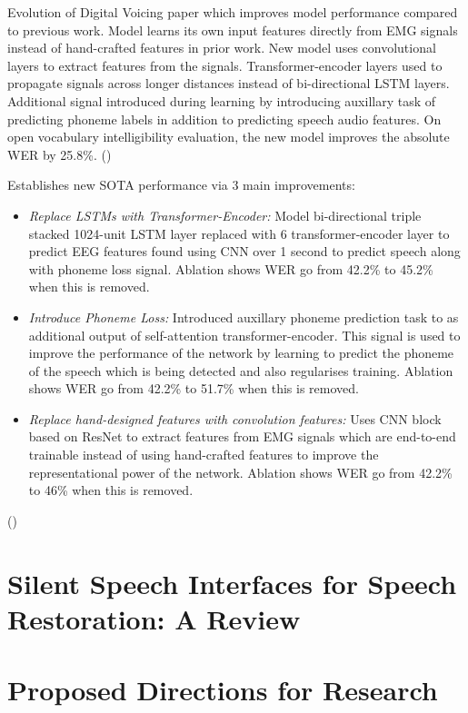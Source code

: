 Evolution of Digital Voicing paper which improves model performance compared to previous work.
Model learns its own input features directly from EMG signals instead of hand-crafted features in prior work.
New model uses convolutional layers to extract features from the signals.
Transformer-encoder layers used to propagate signals across longer distances instead of bi-directional LSTM layers.
Additional signal introduced during learning by introducing auxillary task of predicting phoneme labels in addition to predicting speech audio features.
On open vocabulary intelligibility evaluation, the new model improves the absolute WER by 25.8\%.
(\cite{gaddy2021improved})

Establishes new SOTA performance via 3 main improvements:

\begin{itemize}
  \item \emph{Replace LSTMs with Transformer-Encoder:}
  Model bi-directional triple stacked 1024-unit LSTM layer replaced with 6 transformer-encoder
  layer to predict EEG features found using CNN over 1 second to predict speech along with
  phoneme loss signal.
  Ablation shows WER go from 42.2\% to 45.2\% when this is removed.
  \item \emph{Introduce Phoneme Loss:}
  Introduced auxillary phoneme prediction task to as additional 
  output of self-attention transformer-encoder. This signal is used to improve the performance
  of the network by learning to predict the phoneme of the speech which is being detected and
  also regularises training.
  Ablation shows WER go from 42.2\% to 51.7\% when this is removed.
  \item \emph{Replace hand-designed features with convolution features:}
  Uses CNN block based on ResNet to extract features from EMG signals which are end-to-end
  trainable instead of using hand-crafted features to improve the representational power of the network.
  Ablation shows WER go from 42.2\% to 46\% when this is removed.
\end{itemize}

(\cite{gaddy2021improved})

\section{Silent Speech Interfaces for Speech Restoration: A Review}

\section{Proposed Directions for Research}

